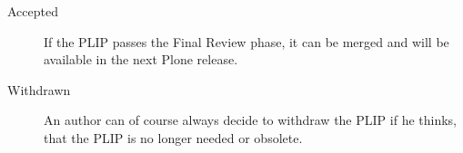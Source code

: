\begin{description}
  \item[Accepted] If the \ac{PLIP} passes the Final Review phase, it can be
    merged and will be available in the next Plone release.

  \item[Withdrawn] An author can of course always decide to withdraw the
    \ac{PLIP} if he thinks, that the \ac{PLIP} is no longer needed or obsolete.

\end{description}


